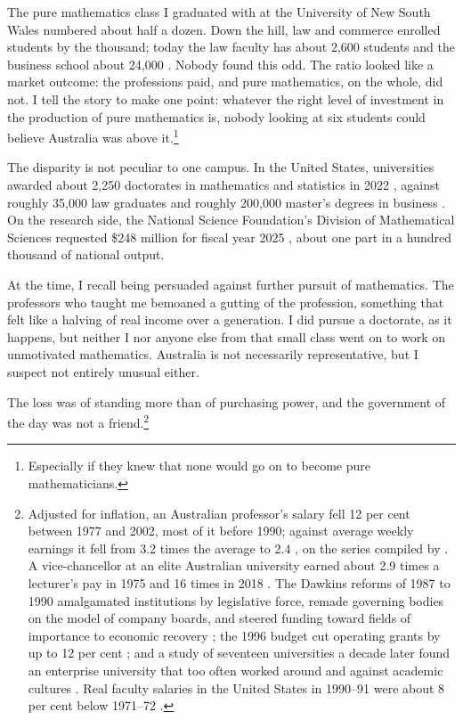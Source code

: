 \documentclass[11pt]{article}
\theoremstyle{definition}
\theoremstyle{remark}
\begin{document}
The pure mathematics class I graduated with at the University of New South Wales numbered about half a dozen. Down the hill, law and commerce enrolled students by the thousand; today the law faculty has about 2{,}600 students \citep{unswlaw} and the business school about 24{,}000 \citep{unswbiz}. Nobody found this odd. The ratio looked like a market outcome: the professions paid, and pure mathematics, on the whole, did not. I tell the story to make one point: whatever the right level of investment in the production of pure mathematics is, nobody looking at six students could believe Australia was above it.\footnote{Especially if they knew that none would go on to become pure mathematicians.}

The disparity is not peculiar to one campus. In the United States, universities awarded about 2{,}250 doctorates in mathematics and statistics in 2022 \citep{nsfsed2025}, against roughly 35{,}000 law graduates \citep{aba2024} and roughly 200{,}000 master's degrees in business \citep{nces2023}. On the research side, the National Science Foundation's Division of Mathematical Sciences requested \$248 million for fiscal year 2025 \citep{nsf2025}, about one part in a hundred thousand of national output.

At the time, I recall being persuaded against further pursuit of mathematics. The professors who taught me bemoaned a gutting of the profession, something that felt like a halving of real income over a generation. I did pursue a doctorate, as it happens, but neither I nor anyone else from that small class went on to work on unmotivated mathematics. Australia is not necessarily representative, but I suspect not entirely unusual either.

The loss was of standing more than of purchasing power, and the government of the day was not a friend.\footnote{Adjusted for inflation, an Australian professor's salary fell 12 per cent between 1977 and 2002, most of it before 1990; against average weekly earnings it fell from 3.2 times the average to 2.4 \citep{robinson2005}, on the series compiled by \citet{horsley2002}. A vice-chancellor at an elite Australian university earned about 2.9 times a lecturer's pay in 1975 and 16 times in 2018 \citep{rowlands2020}. The Dawkins reforms of 1987 to 1990 amalgamated institutions by legislative force, remade governing bodies on the model of company boards, and steered funding toward fields of importance to economic recovery \citep{dawkins1988}; the 1996 budget cut operating grants by up to 12 per cent \citep{the1996}; and a study of seventeen universities a decade later found an enterprise university that too often worked around and against academic cultures \citep{marginson2000}. Real faculty salaries in the United States in 1990--91 were about 8 per cent below 1971--72 \citep{aha1991}.}
\end{document}
